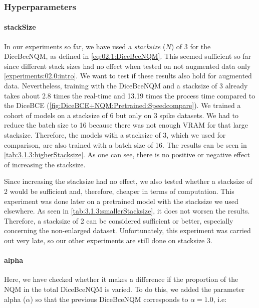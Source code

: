 \subsubsection{Hyperparameters}
\label{experiments:03.1.w:Hyperpatameters}

\paragraph{stackSize}   
\label{experiments:03.1.3:backbone_hippo:stackSize}

In our experiments so far, we have used a \textit{stacksize} ($N$) of 3 for the DiceBceNQM, as defined in \autoref{eq:02.1:DiceBceNQM}. This seemed sufficient so far since different stack sizes had no effect when tested on not augmented data only \autoref{experiments:02.0:intro}. We want to test if these results also hold for augmented data. Nevertheless, training with the DiceBceNQM and a stacksize of 3 already takes about 2.8 times the real-time and 13.19 times the process time compared to the DiceBCE (\autoref{fig:DiceBCE+NQM:Pretrained:Speedcompare}). We trained a cohort of models on a stacksize of 6 but only on 3 spike datasets. We had to reduce the batch size to 16 because there was not enough VRAM for that large stacksize. Therefore, the models with a stacksize of 3, which we used for comparison, are also trained with a batch size of 16. The results can be seen in \autoref{tab:3.1.3:higherStacksize}. As one can see, there is no positive or negative effect of increasing the stacksize.

Since increasing the stacksize had no effect, we also tested whether a stacksize of 2 would be sufficient and, therefore, cheaper in terms of computation. This experiment was done later on a pretrained model with the stacksize we used elsewhere. As seen in \autoref{tab:3.1.3:smallerStacksize}, it does not worsen the results. Therefore, a stacksize of 2 can be considered sufficient or better, especially concerning the non-enlarged dataset. Unfortunately, this experiment was carried out very late, so our other experiments are still done on stacksize 3.
\iftable

\fi

\paragraph{alpha}   
\label{experiments:03.1.4:backbone_hippo:alpha}
Here, we have checked whether it makes a difference if the proportion of the NQM in the total DiceBceNQM is varied. To do this, we added the parameter alpha ($\alpha$) so that the previous DiceBceNQM corresponds to $\alpha=1.0$, i.e:

